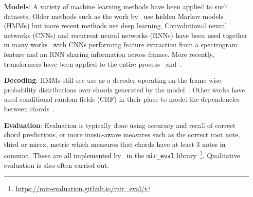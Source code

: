 \textbf{Models}: A variety of machine learning methods have been applied to such datasets. Older methods such as the work by~\citep{ACRHMM} use hidden Markov models (HMMs) but more recent methods use deep learning. Convolutional neural networks (CNNs) and recurrent neural networks (RNNs) have been used together in many works~\citep{ACRCNNRNN1,ACRLargeVocab1,StructuredTraining} with CNNs performing feature extraction from a spectrogram feature and an RNN sharing information across frames. More recently, transformers have been applied to the entire process~\citet{MelodyTranscriptionViaGenerativePreTraining} and~\citet{HarmonyTransformer, AttendToChords}.

\textbf{Decoding}: HMMs still see use as a decoder operating on the frame-wise probability distributions over chords generated by the model~\citep{BalanceRandomForestACR}. Other works have used conditional random fields (CRF) in their place to model the dependencies between chords~\citep{ACRLargeVocab1}.

\textbf{Evaluation}: Evaluation is typically done using accuracy and recall of correct chord predictions, or more music-aware measures such as the correct root note, third or mirex, metric which measures that chords have at least 3 notes in common. These are all implemented by~\citet{mir_eval} in the \texttt{mir\_eval} library~\footnote{\url{https://mir-evaluation.github.io/mir_eval/}}. Qualitative evaluation is also often carried out.




